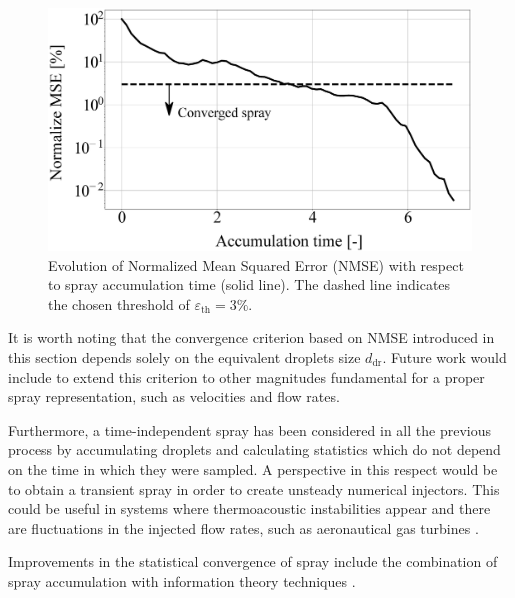 \begin{figure}[h!]
	\centering
	\includegraphics[scale=0.15]{./part2_developments/figures_ch4_SLI/spray_convergence_with_text.eps}
	\caption[Evolution of Normalized Mean Squared Error (NMSE) with respect to spray accumulation time.]{Evolution of Normalized Mean Squared Error (NMSE) with respect to spray accumulation time (solid line). The dashed line indicates the chosen threshold of $\varepsilon_\mathrm{th} = 3 \%$.}
	\label{fig:NMSE_evolution}
\end{figure}



It is worth noting that the convergence criterion based on NMSE introduced in this section depends solely on the equivalent droplets size $d_\mathrm{dr}$. Future work would include to extend this criterion to other magnitudes fundamental for a proper spray representation, such as velocities and flow rates. 

Furthermore, a time-independent spray has been considered in all the previous process by accumulating droplets and calculating statistics which do not depend on the time in which they were sampled. A perspective in this respect would be to obtain a transient spray in order to create unsteady numerical injectors. This could be useful in systems where thermoacoustic instabilities appear and there are fluctuations in the injected flow rates, such as aeronautical gas turbines .

Improvements in the statistical convergence of spray include the combination of spray accumulation with information theory techniques .


%
%
%



